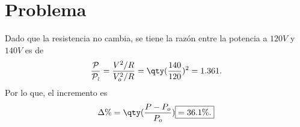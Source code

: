 \section*{Problema}

Dado que la resistencia no cambia, se tiene la razón entre la potencia a $120V$ y $140V$ es de
	$$ \frac{\mathcal{P}}{\mathcal{P_o}} = \frac{V^2 /R}{V_o ^2 /R} = \qty(\frac{140}{120})^2 = 1.361. $$
Por lo que, el incremento es
	$$ \Delta \% = \qty(\frac{P - P_o}{P_o}) \boxed{ = 36.1\% .} $$








